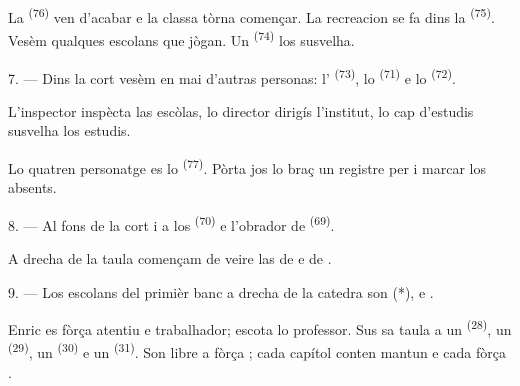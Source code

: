 La  \textsuperscript{(76)} ven d'acabar e la classa tòrna
començar. La recreacion se fa dins la  \textsuperscript{(75)}. Vesèm
qualques escolans que jògan. Un  \textsuperscript{(74)}
los susvelha.

7. --- Dins la cort vesèm en mai d'autras personas: l'
\textsuperscript{(73)}, lo  \textsuperscript{(71)} e lo
 \textsuperscript{(72)}.

L'inspector inspècta las escòlas, lo director dirigís l'institut, lo cap
d'estudis susvelha los estudis.

Lo quatren personatge es lo  \textsuperscript{(77)}. Pòrta jos
lo braç un registre per i marcar los absents.

8. --- Al fons de la cort i a los 
\textsuperscript{(70)} e l'obrador de 
\textsuperscript{(69)}.

A drecha de la taula començam de veire las  de  e de
.


\VUsaut{2.4mm}

\VUsaut{3.0mm}

9. --- Los escolans del primièr banc a drecha de la catedra son 
(*),  e .

Enric es fòrça atentiu e trabalhador; escota lo professor. Sus sa taula a un
 \textsuperscript{(28)}, un  \textsuperscript{(29)},
un  \textsuperscript{(30)} e un 
\textsuperscript{(31)}. Son libre a fòrça ; cada capítol conten
mantun  e cada  fòrça .

